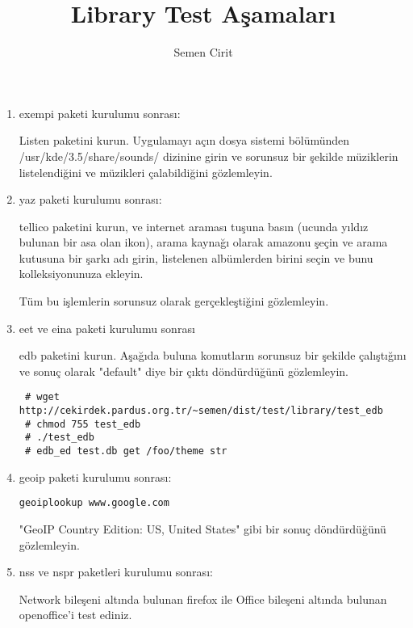 \documentclass[a4paper,10pt]{article}
\title{Library Test Aşamaları}
\author{Semen Cirit}
\begin{document}
\maketitle
\begin{enumerate}
\item exempi paketi kurulumu sonrası:

Listen paketini kurun. Uygulamayı açın dosya sistemi bölümünden /usr/kde/3.5/share/sounds/ dizinine girin ve sorunsuz bir şekilde müziklerin listelendiğini ve müzikleri çalabildiğini gözlemleyin.

\item yaz paketi kurulumu sonrası:

tellico paketini kurun, ve internet araması tuşuna basın (ucunda yıldız bulunan bir asa olan ikon), arama kaynağı olarak amazonu şeçin ve arama kutusuna bir şarkı adı girin, listelenen albümlerden birini seçin ve bunu kolleksiyonunuza ekleyin. 

Tüm bu işlemlerin sorunsuz olarak gerçekleştiğini gözlemleyin.


\item eet ve eina paketi kurulumu sonrası

edb paketini kurun. Aşağıda buluna komutların sorunsuz bir şekilde çalıştığını ve sonuç olarak "default" diye bir çıktı döndürdüğünü gözlemleyin.
\begin{verbatim}
 # wget http://cekirdek.pardus.org.tr/~semen/dist/test/library/test_edb
 # chmod 755 test_edb
 # ./test_edb
 # edb_ed test.db get /foo/theme str
\end{verbatim}

\item geoip paketi kurulumu sonrası:
\begin{verbatim}
geoiplookup www.google.com 
\end{verbatim}
"GeoIP Country Edition: US, United States" gibi bir sonuç döndürdüğünü gözlemleyin.

\item nss ve nspr paketleri kurulumu sonrası:

Network bileşeni altında bulunan firefox ile Office bileşeni altında bulunan openoffice'i test ediniz.	
\end{enumerate}
\end{document}
